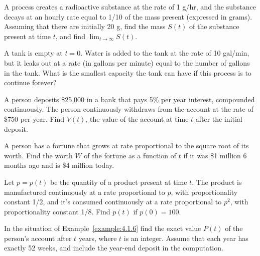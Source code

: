 \begin{exerciselist}
  \item\label{exer:4.1.16} A process creates a radioactive substance at the rate of 1 g/hr, and the
        substance decays at an hourly rate equal to 1/10 of the mass present (expressed in grams).
        Assuming that there are initially 20 g, find the mass $S(t)$ of the substance present at
        time $t$, and find $\lim_{t\to\infty}S(t)$.

  \item\label{exer:4.1.17} A tank is empty at $t=0$. Water is added to the tank at the rate of 10
        gal/min, but it leaks out at a rate (in gallons per minute) equal to the number of gallons
        in the tank. What is the smallest capacity the tank can have if this process is to continue
        forever?

  \item\label{exer:4.1.18} A person deposits \$25,000 in a bank that pays 5\% per year interest,
        compounded continuously. The person continuously withdraws from the account at the rate of
        \$750 per year. Find $V(t)$, the value of the account at time $t$ after the initial deposit.

  \item\label{exer:4.1.19} A person has a fortune that grows at rate proportional to the square root
        of its worth. Find the worth $W$ of the fortune as a function of $t$ if it was \$1 million 6
        months ago and is \$4 million today.

  \item\label{exer:4.1.20} Let $p=p(t)$ be the quantity of a product present at time $t$. The
        product is manufactured continuously at a rate proportional to $p$, with proportionality
        constant 1/2, and it's consumed continuously at a rate proportional to $p^{2}$, with
        proportionality constant 1/8. Find $p(t)$ if $p(0)=100$.

  \item\label{exer:4.1.21}

  \begin{alist}
    \item %
    In the situation of Example~\ref{example:4.1.6} find the exact value $P(t)$ of the person's
    account after $t$ years, where $t$ is an integer. Assume that each year has exactly 52 weeks,
    and include the year-end deposit in the computation.



\end{alist}
\end{exerciselist}
